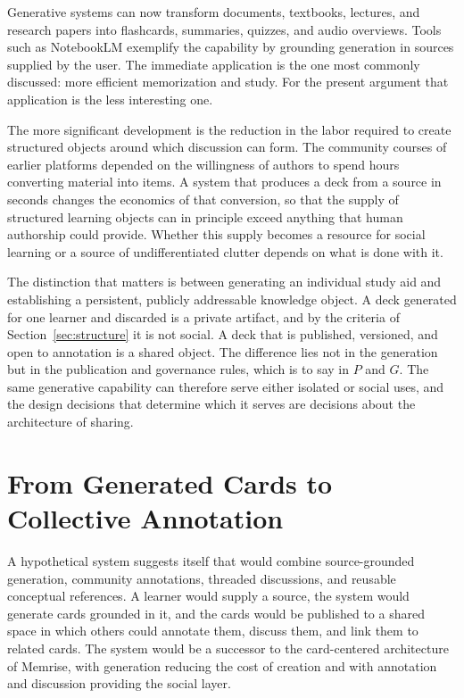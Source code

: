 \documentclass[11pt]{article}
\theoremstyle{remark}
\newcommand{\Pp}{P}
\newcommand{\Gg}{G}
\begin{document}
Generative systems can now transform documents, textbooks, lectures, and research papers into flashcards, summaries, quizzes, and audio overviews. Tools such as NotebookLM exemplify the capability by grounding generation in sources supplied by the user. The immediate application is the one most commonly discussed: more efficient memorization and study. For the present argument that application is the less interesting one.

The more significant development is the reduction in the labor required to create structured objects around which discussion can form. The community courses of earlier platforms depended on the willingness of authors to spend hours converting material into items. A system that produces a deck from a source in seconds changes the economics of that conversion, so that the supply of structured learning objects can in principle exceed anything that human authorship could provide. Whether this supply becomes a resource for social learning or a source of undifferentiated clutter depends on what is done with it.

The distinction that matters is between generating an individual study aid and establishing a persistent, publicly addressable knowledge object. A deck generated for one learner and discarded is a private artifact, and by the criteria of Section~\ref{sec:structure} it is not social. A deck that is published, versioned, and open to annotation is a shared object. The difference lies not in the generation but in the publication and governance rules, which is to say in $\Pp$ and $\Gg$. The same generative capability can therefore serve either isolated or social uses, and the design decisions that determine which it serves are decisions about the architecture of sharing.

\section{From Generated Cards to Collective Annotation}
\label{sec:annotation}

A hypothetical system suggests itself that would combine source-grounded generation, community annotations, threaded discussions, and reusable conceptual references. A learner would supply a source, the system would generate cards grounded in it, and the cards would be published to a shared space in which others could annotate them, discuss them, and link them to related cards. The system would be a successor to the card-centered architecture of Memrise, with generation reducing the cost of creation and with annotation and discussion providing the social layer.
\end{document}
